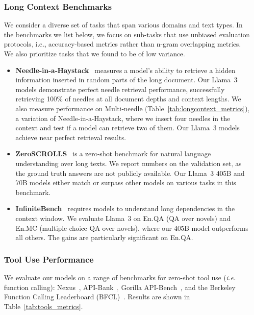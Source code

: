 \subsubsection{Long Context Benchmarks}
\label{subsubsec:long_context_evals}

We consider a diverse set of tasks that span various domains and text types. In the benchmarks we list below, we focus on sub-tasks that use unbiased evaluation protocols, i.e., accuracy-based metrics rather than n-gram overlapping metrics. We also prioritize tasks that we found to be of low variance.

\begin{itemize}
    \item \textbf{Needle-in-a-Haystack}~\citep{niah}
    measures a model’s ability to retrieve a hidden information inserted in random parts of the long document. Our Llama~3 models demonstrate perfect needle retrieval performance, successfully retrieving 100\% of needles at all document depths and context lengths. We also measure performance on Multi-needle (Table~\ref{tab:longcontext_metrics}), a variation of Needle-in-a-Haystack, where we insert four needles in the context and test if a model can retrieve two of them. Our Llama~3 models achieve near perfect retrieval results.
    \item \textbf{ZeroSCROLLS}~\citep{zeroscrolls} is a zero-shot benchmark for natural language understanding over long texts. We report numbers on the validation set, as the ground truth answers are not publicly available. Our Llama~3 405B and 70B models either match or surpass other models on various tasks in this benchmark.
    \item \textbf{InfiniteBench}~\citep{zhang2024infty} requires models to understand long dependencies in the context window. We evaluate Llama~3 on En.QA (QA over novels) and En.MC (multiple-choice QA over novels), where our 405B model outperforms all others. The gains are particularly significant on En.QA.
\end{itemize}

\subsubsection{Tool Use Performance}
\label{subsubsec:tool_use_evals}

We evaluate our models on a range of benchmarks for zero-shot tool use (\emph{i.e.} function calling): Nexus~\citep{srinivasan2023nexusraven}, API-Bank~\citep{li2023api}, Gorilla API-Bench~\citep{patil2023gorilla}, and the Berkeley Function Calling Leaderboard (BFCL)~\citep{berkeley-function-calling-leaderboard}. Results are shown in Table~\ref{tab:tools_metrics}.

